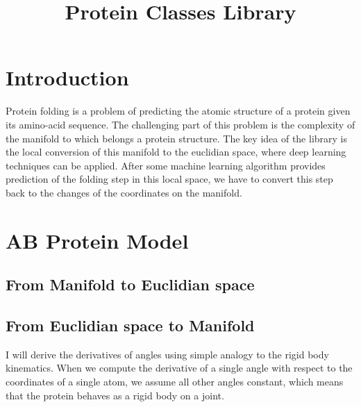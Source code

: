 \documentclass[a4paper,10pt]{article}
\title{Protein Classes Library}
\author{}
\begin{document}
\maketitle

\section{Introduction}
Protein folding is a problem of predicting the atomic structure of a protein given its amino-acid sequence. 
The challenging part of this problem is the complexity of the manifold to which belongs a protein structure.
The key idea of the library is the local conversion of this manifold to the euclidian space, where deep learning
techniques can be applied. After some machine learning algorithm provides prediction of the folding step in this 
local space, we have to convert this step back to the changes of the coordinates on the manifold.

\section{AB Protein Model}

\subsection{From Manifold to Euclidian space}
%

\subsection{From Euclidian space to Manifold}
I will derive the derivatives of angles using simple analogy to the rigid body kinematics.
When we compute the derivative of a single angle with respect to the coordinates of a single atom, 
we assume all other angles constant, which means that the protein behaves as a rigid body on a joint.





\end{document}
